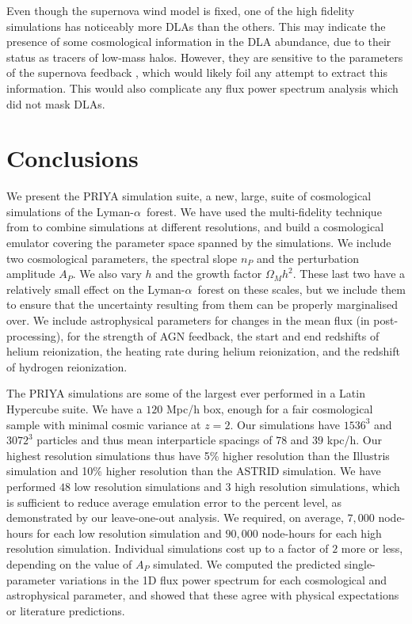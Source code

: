 \documentclass[a4paper,11pt]{article}
\newcommand{\Lya}{Lyman-$\alpha$}
\begin{document}
Even though the supernova wind model is fixed, one of the high fidelity simulations has noticeably more DLAs than the others. This may indicate the presence of some cosmological information in the DLA abundance, due to their status as tracers of low-mass halos. However, they are sensitive to the parameters of the supernova feedback \cite{Bird:2014}, which would likely foil any attempt to extract this information. This would also complicate any flux power spectrum analysis which did not mask DLAs.

\section{Conclusions}
\label{sec:conclusions}

We present the PRIYA simulation suite, a new, large, suite of cosmological simulations of the \Lya\ forest. We have used the multi-fidelity technique from \cite{Ho:2022, Fernandez:2022} to combine simulations at different resolutions, and build a cosmological emulator covering the parameter space spanned by the simulations. We include two cosmological parameters, the spectral slope $n_P$ and the perturbation amplitude $A_P$. We also vary $h$ and the growth factor $\Omega_M h^2$. These last two have a relatively small effect on the \Lya~forest on these scales, but we include them to ensure that the uncertainty resulting from them can be properly marginalised over. We include astrophysical parameters for changes in the mean flux (in post-processing), for the strength of AGN feedback, the start and end redshifts of helium reionization, the heating rate during helium reionization, and the redshift of hydrogen reionization.

The PRIYA simulations are some of the largest ever performed in a Latin Hypercube suite. We have a $120$ Mpc/h box, enough for a fair cosmological sample with minimal cosmic variance at $z=2$. Our simulations have $1536^3$ and $3072^3$ particles and thus mean interparticle spacings of $78$ and $39$ kpc/h. Our highest resolution simulations thus have 5\% higher resolution than the Illustris \cite{Vogelsberger:2014} simulation and 10\% higher resolution than the ASTRID \cite{Bird:2022, Ni:2021} simulation. We have performed $48$ low resolution simulations and $3$ high resolution simulations, which is sufficient to reduce average emulation error to the percent level, as demonstrated by our leave-one-out analysis. We required, on average, $7,000$ node-hours for each low resolution simulation and $90,000$ node-hours for each high resolution simulation. Individual simulations cost up to a factor of $2$ more or less, depending on the value of $A_P$ simulated. We computed the predicted single-parameter variations in the 1D flux power spectrum for each cosmological and astrophysical parameter, and showed that these agree with physical expectations or literature predictions.
\end{document}
